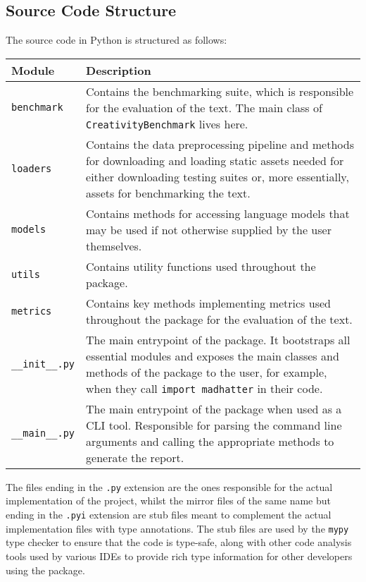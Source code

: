 \subsection{Source Code Structure}

The source code in Python is structured as follows:

\begin{table}[htbp]
    \centering
    \begin{tabular}{p{}p{}}
        \toprule
        \textbf{Module} & \textbf{Description} \\
        \midrule
        \texttt{benchmark} & Contains the benchmarking suite, which is responsible for the evaluation of the text. The main class of \texttt{CreativityBenchmark} lives here. \\
        \texttt{loaders} & Contains the data preprocessing pipeline and methods for downloading and loading static assets needed for either downloading testing suites or, more essentially, assets for benchmarking the text. \\
        \texttt{models} & Contains methods for accessing language models that may be used if not otherwise supplied by the user themselves. \\
        \texttt{utils} & Contains utility functions used throughout the package. \\
        \texttt{metrics} & Contains key methods implementing metrics used throughout the package for the evaluation of the text. \\
        \texttt{\_\_init\_\_.py} & The main entrypoint of the package. It bootstraps all essential modules and exposes the main classes and methods of the package to the user, for example, when they call \texttt{import madhatter} in their code. \\
        \texttt{\_\_main\_\_.py} & The main entrypoint of the package when used as a CLI tool. Responsible for parsing the command line arguments and calling the appropriate methods to generate the report. \\
        \bottomrule
    \end{tabular}
\end{table}


The files ending in the \texttt{.py} extension are the ones responsible for the actual implementation of the project, whilst the mirror files of the same name but ending in the \texttt{.pyi} extension are stub files meant to complement the actual implementation files with type annotations. The stub files are used by the \texttt{mypy} type checker to ensure that the code is type-safe, along with other code analysis tools used by various IDEs to provide rich type information for other developers using the package.

